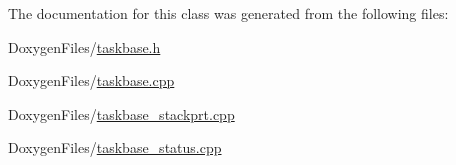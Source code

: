 The documentation for this class was generated from the following files\+:\begin{DoxyCompactItemize}
\item 
Doxygen\+Files/\mbox{\hyperlink{taskbase_8h}{taskbase.\+h}}\item 
Doxygen\+Files/\mbox{\hyperlink{taskbase_8cpp}{taskbase.\+cpp}}\item 
Doxygen\+Files/\mbox{\hyperlink{taskbase__stackprt_8cpp}{taskbase\+\_\+stackprt.\+cpp}}\item 
Doxygen\+Files/\mbox{\hyperlink{taskbase__status_8cpp}{taskbase\+\_\+status.\+cpp}}\end{DoxyCompactItemize}
